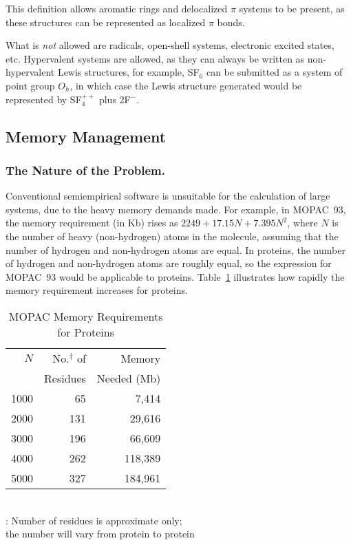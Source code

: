 This definition allows aromatic rings and delocalized $\pi$ systems to be
present, as these structures can be represented as localized $\pi$ bonds.

What is {\em not} allowed are radicals, open-shell systems, electronic
excited states, etc.  Hypervalent systems are allowed, as they can always be
written as non-hypervalent Lewis structures, for example, SF$_6$ can be submitted
as a system of point group $O_h$, in which case the Lewis structure generated
would be represented by SF$_4^{++}$ plus 2F$^-$.

\subsection{Memory Management}
\subsubsection{The Nature of the Problem.}
Conventional semiempirical software is unsuitable for the calculation of large
systems, due to the heavy memory demands made.  For example, in MOPAC~93, the
memory requirement (in Kb) rises as $2249+17.15N+7.395N^2$,  where $N$ is the
number of heavy (non-hydrogen) atoms in the molecule, assuming that the number
of hydrogen and non-hydrogen atoms are equal.  In proteins, the number of
hydrogen and non-hydrogen atoms are roughly equal, so the expression for
MOPAC~93 would be applicable to proteins.  Table~\ref{n2size} illustrates how
rapidly the memory requirement increases for proteins.

\begin{table}
\caption{\label{n2size} MOPAC Memory Requirements for Proteins}
\begin{center}
\begin{tabular}{rrr}
\hline 
$N$   &  No.$^{\dag}$ of &   Memory   \\
      & Residues & Needed (Mb)  \\ \hline
1000  &  65  &  7,414 \\
2000  & 131  & 29,616 \\
3000  & 196  & 66,609 \\
4000  & 262  &118,389 \\
5000  & 327  &184,961 \\
\hline
\end{tabular} \\
\dag : Number of residues is approximate only;\\ the number will vary
from protein to protein
\end{center}
\end{table}

